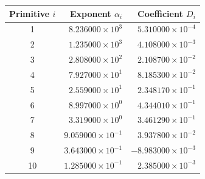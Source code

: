 \begin{tabular}{crr}
\toprule
Primitive $i$ & Exponent $\alpha_i$ & Coefficient $D_i$\\
\midrule
1  & $8.236000\times10^{3}$  & $5.310000\times10^{-4}$\\
2  & $1.235000\times10^{3}$  & $4.108000\times10^{-3}$\\
3  & $2.808000\times10^{2}$  & $2.108700\times10^{-2}$\\
4  & $7.927000\times10^{1}$  & $8.185300\times10^{-2}$\\
5  & $2.559000\times10^{1}$  & $2.348170\times10^{-1}$\\
6  & $8.997000\times10^{0}$  & $4.344010\times10^{-1}$\\
7  & $3.319000\times10^{0}$  & $3.461290\times10^{-1}$\\
8  & $9.059000\times10^{-1}$ & $3.937800\times10^{-2}$\\
9  & $3.643000\times10^{-1}$ & $-8.983000\times10^{-3}$\\
10 & $1.285000\times10^{-1}$ & $2.385000\times10^{-3}$\\
\bottomrule
\end{tabular}
